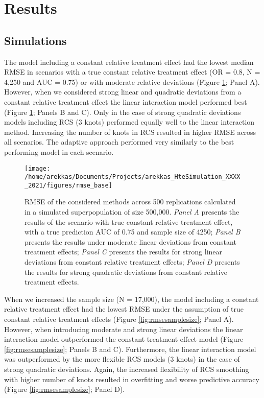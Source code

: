 \documentclass{article}
\begin{document}
\hypertarget{results}{%
\section{Results}\label{results}}

\hypertarget{simulations}{%
\subsection{Simulations}\label{simulations}}

The model including a constant relative treatment effect had the lowest
median RMSE in scenarios with a true constant relative treatment effect
(OR = 0.8, N = 4,250 and AUC = 0.75) or with moderate relative
deviations (Figure \ref{fig:rmsebase}; Panel A). However, when we
considered strong linear and quadratic deviations from a constant
relative treatment effect the linear interaction model performed best
(Figure \ref{fig:rmsebase}; Panels B and C). Only in the case of strong
quadratic deviations models including RCS (3 knots) performed equally
well to the linear interaction method. Increasing the number of knots in
RCS resulted in higher RMSE across all scenarios. The adaptive approach
performed very similarly to the best performing model in each scenario.

\begin{figure}
\texttt{[image: /home/arekkas/Documents/Projects/arekkas\_HteSimulation\_XXXX\_2021/figures/rmse\_base]} \caption{RMSE of the considered methods across 500 replications calculated in a simulated superpopulation of size 500,000. \textit{Panel A} presents the results of the scenario with true constant relative treatment effect, with a true prediction AUC of 0.75 and sample size of 4250; \textit{Panel B} presents the results under moderate linear deviations from constant treatment effects; \textit{Panel C} presents the results for strong linear deviations from constant relative treatment effects; \textit{Panel D} presents the results for strong quadratic deviations from constant relative treatment effects.}\label{fig:rmsebase}
\end{figure}

When we increased the sample size (N = 17,000), the model including a
constant relative treatment effect had the lowest RMSE under the
assumption of true constant relative treatment effects (Figure
\ref{fig:rmsesamplesize}; Panel A). However, when introducing moderate
and strong linear deviations the linear interaction model outperformed
the constant treatment effect model (Figure \ref{fig:rmsesamplesize};
Panels B and C). Furthermore, the linear interaction model was
outperformed by the more flexible RCS models (3 knots) in the case of
strong quadratic deviations. Again, the increased flexibility of RCS
smoothing with higher number of knots resulted in overfitting and worse
predictive accuracy (Figure \ref{fig:rmsesamplesize}; Panel D).
\end{document}
